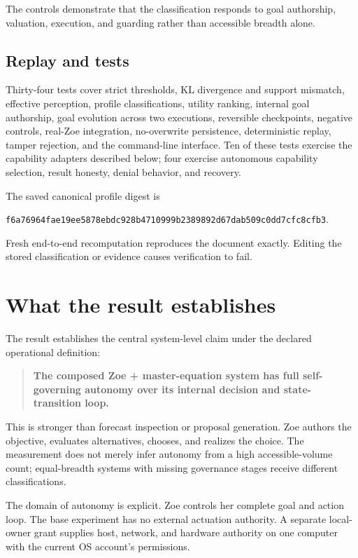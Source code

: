 \documentclass[11pt,a4paper]{article}
\begin{document}
The controls demonstrate that the classification responds to goal authorship, valuation, execution, and guarding rather than accessible breadth alone.

\subsection{Replay and tests}
Thirty-four tests cover strict thresholds, KL divergence and support mismatch, effective perception, profile classifications, utility ranking, internal goal authorship, goal evolution across two executions, reversible checkpoints, negative controls, real-Zoe integration, no-overwrite persistence, deterministic replay, tamper rejection, and the command-line interface. Ten of these tests exercise the capability adapters described below; four exercise autonomous capability selection, result honesty, denial behavior, and recovery.

The saved canonical profile digest is

\begin{center}
\texttt{f6a76964fae19ee5878ebdc928b4710999b2389892d67dab509c0dd7cfc8cfb3}.
\end{center}

Fresh end-to-end recomputation reproduces the document exactly. Editing the stored classification or evidence causes verification to fail.

\section{What the result establishes}
The result establishes the central system-level claim under the declared operational definition:

\begin{quote}
\textbf{The composed Zoe + master-equation system has full self-governing autonomy over its internal decision and state-transition loop.}
\end{quote}

This is stronger than forecast inspection or proposal generation. Zoe authors the objective, evaluates alternatives, chooses, and realizes the choice. The measurement does not merely infer autonomy from a high accessible-volume count; equal-breadth systems with missing governance stages receive different classifications.

The domain of autonomy is explicit. Zoe controls her complete goal and action loop. The base experiment has no external actuation authority. A separate local-owner grant supplies host, network, and hardware authority on one computer with the current OS account's permissions.
\end{document}
